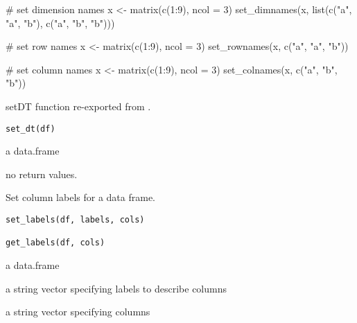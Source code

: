 \documentclass[letterpaper]{book}
\begin{document}
%
\begin{Examples}
\begin{ExampleCode}
# set dimension names
x <- matrix(c(1:9), ncol = 3)
set_dimnames(x, list(c("a", "a", "b"), c("a", "b", "b")))

# set row names
x <- matrix(c(1:9), ncol = 3)
set_rownames(x, c("a", "a", "b"))

# set column names
x <- matrix(c(1:9), ncol = 3)
set_colnames(x, c("a", "b", "b"))

\end{ExampleCode}
\end{Examples}
%
\begin{Description}
setDT function re-exported from .
\end{Description}
%
\begin{Usage}
\begin{verbatim}
set_dt(df)
\end{verbatim}
\end{Usage}
%
\begin{Arguments}
\begin{ldescription}
\item[\code{df}] a data.frame
\end{ldescription}
\end{Arguments}
%
\begin{Value}
no return values.
\end{Value}
%
\begin{SeeAlso}
\end{SeeAlso}
%
\begin{Description}
Set column labels for a data frame.
\end{Description}
%
\begin{Usage}
\begin{verbatim}
set_labels(df, labels, cols)

get_labels(df, cols)
\end{verbatim}
\end{Usage}
%
\begin{Arguments}
\begin{ldescription}
\item[\code{df}] a data.frame

\item[\code{labels}] a string vector specifying labels to describe columns

\item[\code{cols}] a string vector specifying columns
\end{ldescription}
\end{Arguments}
\end{document}
